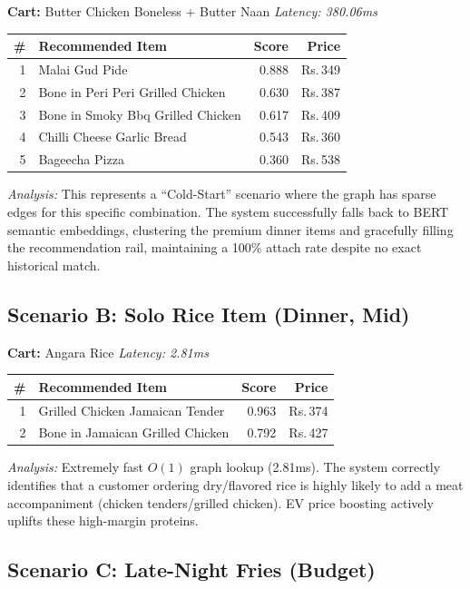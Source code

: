 \documentclass[10pt, twocolumn, a4paper]{article}
\newcommand{\Rs}{\textrm{Rs.\,}}
\begin{document}
\textbf{Cart:} Butter Chicken Boneless + Butter Naan \hfill \textit{Latency: 380.06ms}

\begin{center}
\small
\begin{tabular}{@{}r l r r@{}}
\toprule
\textbf{\#} & \textbf{Recommended Item} & \textbf{Score} & \textbf{Price} \\
\midrule
1 & Malai Gud Pide & 0.888 & \Rs349 \\
2 & Bone in Peri Peri Grilled Chicken & 0.630 & \Rs387 \\
3 & Bone in Smoky Bbq Grilled Chicken & 0.617 & \Rs409 \\
4 & Chilli Cheese Garlic Bread & 0.543 & \Rs360 \\
5 & Bageecha Pizza & 0.360 & \Rs538 \\
\bottomrule
\end{tabular}
\end{center}
\textit{Analysis:} This represents a ``Cold-Start'' scenario where the graph has sparse edges for this specific combination. The system successfully falls back to BERT semantic embeddings, clustering the premium dinner items and gracefully filling the recommendation rail, maintaining a 100\% attach rate despite no exact historical match.

\subsection{Scenario B: Solo Rice Item (Dinner, Mid)}

\textbf{Cart:} Angara Rice \hfill \textit{Latency: 2.81ms}

\begin{center}
\small
\begin{tabular}{@{}r l r r@{}}
\toprule
\textbf{\#} & \textbf{Recommended Item} & \textbf{Score} & \textbf{Price} \\
\midrule
1 & Grilled Chicken Jamaican Tender & 0.963 & \Rs374 \\
2 & Bone in Jamaican Grilled Chicken & 0.792 & \Rs427 \\
\bottomrule
\end{tabular}
\end{center}
\textit{Analysis:} Extremely fast $O(1)$ graph lookup (2.81ms). The system correctly identifies that a customer ordering dry/flavored rice is highly likely to add a meat accompaniment (chicken tenders/grilled chicken). EV price boosting actively uplifts these high-margin proteins.

\subsection{Scenario C: Late-Night Fries (Budget)}
\end{document}
